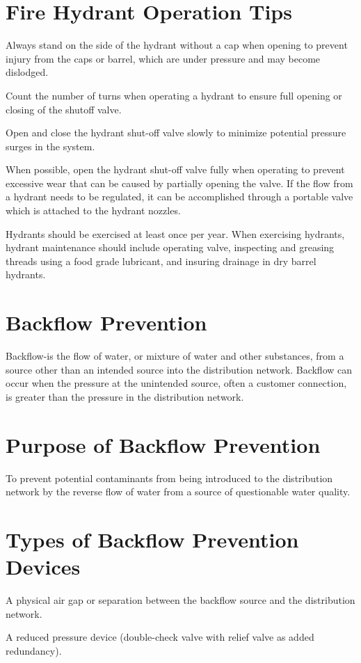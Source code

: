 \documentclass[10pt]{article}
\begin{document}
\section{Fire Hydrant Operation Tips}
Always stand on the side of the hydrant without a cap when opening to prevent injury from the caps or barrel, which are under pressure and may become dislodged.

Count the number of turns when operating a hydrant to ensure full opening or closing of the shutoff valve.

Open and close the hydrant shut-off valve slowly to minimize potential pressure surges in the system.

When possible, open the hydrant shut-off valve fully when operating to prevent excessive wear that can be caused by partially opening the valve. If the flow from a hydrant needs to be regulated, it can be accomplished through a portable valve which is attached to the hydrant nozzles.

Hydrants should be exercised at least once per year. When exercising hydrants, hydrant maintenance should include operating valve, inspecting and greasing threads using a food grade lubricant, and insuring drainage in dry barrel hydrants.

\section{Backflow Prevention}
Backflow-is the flow of water, or mixture of water and other substances, from a source other than an intended source into the distribution network. Backflow can occur when the pressure at the unintended source, often a customer connection, is greater than the pressure in the distribution network.

\section{Purpose of Backflow Prevention}
To prevent potential contaminants from being introduced to the distribution network by the reverse flow of water from a source of questionable water quality.

\section{Types of Backflow Prevention Devices}
A physical air gap or separation between the backflow source and the distribution network.

A reduced pressure device (double-check valve with relief valve as added redundancy).
\end{document}
